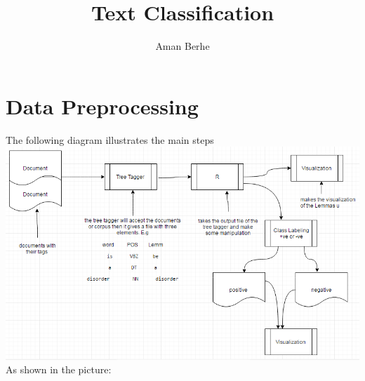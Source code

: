 \documentclass{article}
\title{Text Classification }
\author{Aman Berhe}
\begin{document}
	\maketitle
	\newpage
	\section{Data Preprocessing}
	The following diagram illustrates the main steps\\
	\includegraphics[scale=0.8]{textcl_diagram.PNG}\\   
	As shown in the picture:
\end{document}
